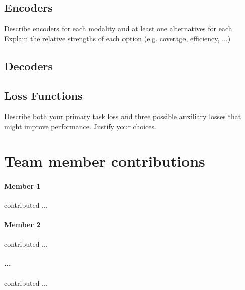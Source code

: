 \documentclass[11pt,a4paper]{article}
\begin{document}
\subsection{Encoders}
Describe encoders for each modality and at least one alternatives for each.  Explain the relative strengths of each option (e.g. coverage, efficiency, ...)

\subsection{Decoders}

\subsection{Loss Functions}
Describe both your primary task loss and three possible auxiliary losses that might improve performance.  Justify your choices.

\clearpage
\section{Team member contributions}
\paragraph{Member 1} contributed ...

\paragraph{Member 2} contributed ...

\paragraph{...} contributed ...





\end{document}
